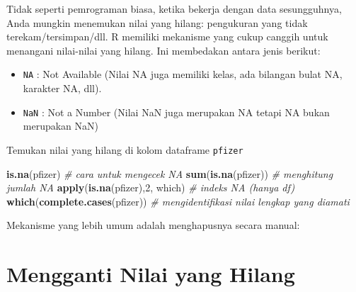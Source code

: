\documentclass[
]{book}
\newenvironment{Shaded}{\begin{snugshade}}{\end{snugshade}}
\newcommand{\CommentTok}[1]{\textcolor[rgb]{0.56,0.35,0.01}{\textit{#1}}}
\newcommand{\DecValTok}[1]{\textcolor[rgb]{0.00,0.00,0.81}{#1}}
\newcommand{\KeywordTok}[1]{\textcolor[rgb]{0.13,0.29,0.53}{\textbf{#1}}}
\newcommand{\NormalTok}[1]{#1}
\newcommand{\OperatorTok}[1]{\textcolor[rgb]{0.81,0.36,0.00}{\textbf{#1}}}
\newcommand{\StringTok}[1]{\textcolor[rgb]{0.31,0.60,0.02}{#1}}
\providecommand{\tightlist}{%
  \setlength{\itemsep}{0pt}\setlength{\parskip}{0pt}}
\begin{document}
Tidak seperti pemrograman biasa, ketika bekerja dengan data sesungguhnya, Anda mungkin menemukan nilai yang hilang: pengukuran yang tidak terekam/tersimpan/dll. R memiliki mekanisme yang cukup canggih untuk menangani nilai-nilai yang hilang. Ini membedakan antara jenis berikut:

\begin{itemize}
\tightlist
\item
  \texttt{NA} : Not Available (Nilai NA juga memiliki kelas, ada bilangan bulat NA, karakter NA, dll).
\item
  \texttt{NaN} : Not a Number (Nilai NaN juga merupakan NA tetapi NA bukan merupakan NaN)
\end{itemize}

Temukan nilai yang hilang di kolom dataframe \texttt{pfizer}

\begin{Shaded}
\begin{Highlighting}[]
\KeywordTok{is.na}\NormalTok{(pfizer)                                     }\CommentTok{# cara untuk mengecek NA}
\KeywordTok{sum}\NormalTok{(}\KeywordTok{is.na}\NormalTok{(pfizer))                                }\CommentTok{# menghitung jumlah NA}
\KeywordTok{apply}\NormalTok{(}\KeywordTok{is.na}\NormalTok{(pfizer),}\DecValTok{2}\NormalTok{, which)                     }\CommentTok{# indeks NA (hanya df)}
\KeywordTok{which}\NormalTok{(}\KeywordTok{complete.cases}\NormalTok{(pfizer))                     }\CommentTok{# mengidentifikasi nilai lengkap yang diamati}
\end{Highlighting}
\end{Shaded}

Mekanisme yang lebih umum adalah menghapusnya secara manual:

\begin{Shaded}
\end{Shaded}

\hypertarget{mengganti-nilai-yang-hilang}{%
\section{Mengganti Nilai yang Hilang}\label{mengganti-nilai-yang-hilang}}
\end{document}
